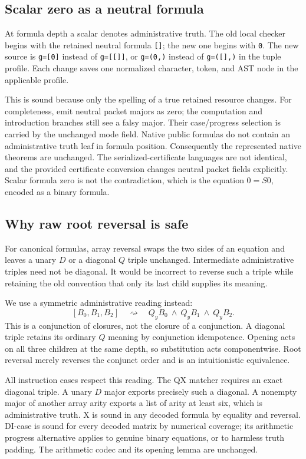 \documentclass[11pt,letterpaper]{article}
\theoremstyle{definition}\newtheorem{definition}[theorem]{Definition}
\theoremstyle{remark}\newtheorem{remark}[theorem]{Remark}
\newcommand{\code}[1]{{\small\nolinkurl{#1}}}
\begin{document}
\subsection{Scalar zero as a neutral formula}

At formula depth a scalar denotes administrative truth. The old local
checker begins with the retained neutral formula \code{[]}; the new
one begins with \code{0}. The new source is \code{g=[0]} instead of
\code{g=[[]]}, or \code{g=(0,)} instead of \code{g=([],)} in the tuple
profile. Each change saves one normalized character, token, and AST
node in the applicable profile.

This is sound because only the spelling of a true retained resource
changes. For completeness, emit neutral packet majors as zero; the
computation and introduction branches still see a falsy major. Their
case/progress selection is carried by the unchanged mode field. Native
public formulas do not contain an administrative truth leaf in formula
position. Consequently the represented native theorems are unchanged.
The serialized-certificate languages are not identical, and the
provided certificate conversion changes neutral packet fields explicitly.
Scalar formula zero is not the contradiction, which is the equation
$0=S0$, encoded as a binary formula.

\subsection{Why raw root reversal is safe}
\label{sec:raw-reversal}

For canonical formulas, array reversal swaps the two sides of an
equation and leaves a unary $D$ or a diagonal $Q$ triple unchanged.
Intermediate administrative triples need not be diagonal. It would be
incorrect to reverse such a triple while retaining the old convention
that only its last child supplies its meaning.

We use a symmetric administrative reading instead:
\[
 [B_0,B_1,B_2]\quad\rightsquigarrow\quad
 Q_yB_0\ \land\ Q_yB_1\ \land\ Q_yB_2.
 \tag{Triple reading}\label{eq:triple-reading}
\]
This is a conjunction of closures, not the closure of a conjunction.
A diagonal triple retains its ordinary $Q$ meaning by conjunction
idempotence. Opening acts on all three children at the same depth, so
substitution acts componentwise. Root reversal merely reverses the
conjunct order and is an intuitionistic equivalence.

All instruction cases respect this reading. The QX matcher requires an
exact diagonal triple. A unary $D$ major exports precisely such a
diagonal. A nonempty major of another array arity exports a list of
arity at least six, which is administrative truth. X is sound in any
decoded formula by equality and reversal. DI-case is sound for every
decoded matrix by numerical coverage; its arithmetic progress alternative
applies to genuine binary equations, or to harmless truth padding.
The arithmetic codec and its opening lemma are unchanged.
\end{document}
